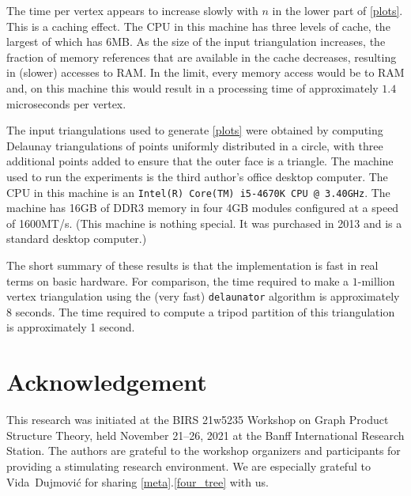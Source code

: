 \documentclass{patmorin}
\begin{document}
The time per vertex appears to increase slowly with $n$ in the lower part of \cref{plots}. This is a caching effect. The CPU in this machine has three levels of cache, the largest of which has 6MB.  As the size of the input triangulation increases, the fraction of memory references that are available in the cache decreases, resulting in (slower) accesses to RAM.  In the limit, every memory access would be to RAM and, on this machine this would result in a processing time of approximately $1.4$ microseconds per vertex.

The input triangulations used to generate \cref{plots} were obtained by computing Delaunay triangulations of points uniformly distributed in a circle, with three additional points added to ensure that the outer face is a triangle.  The machine used to run the experiments is the third author's office desktop computer. The CPU in this machine is an \texttt{Intel(R) Core(TM) i5-4670K CPU @ 3.40GHz}. The machine has 16GB of DDR3 memory in four 4GB modules configured at a speed of 1600MT/s.  (This machine is nothing special. It was purchased in 2013 and is a standard desktop computer.)

The short summary of these results is that the implementation is fast in real terms on basic hardware. For comparison, the time required to make a $1$-million vertex triangulation using the (very fast) \texttt{delaunator} algorithm \cite{delfrrr:delaunator} is approximately 8 seconds. The time required to compute a tripod partition of this triangulation is approximately 1 second.  

\section*{Acknowledgement}

This research was initiated at the BIRS 21w5235 Workshop on Graph Product Structure Theory, held November 21--26, 2021 at the Banff International Research Station.  The authors are grateful to the workshop organizers and participants for providing a stimulating research environment.  We are especially grateful to Vida~Dujmović for sharing \cref{meta}.\ref{four_tree} with us.




\end{document}
